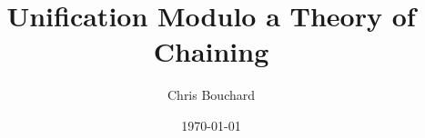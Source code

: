 \documentclass[11pt,titlepage]{book}
\title{Unification Modulo a Theory of Chaining}
\author{Chris Bouchard}
\date{\ddmmmyyyydate\today}
\begin{document}

    \begin{titlepage}
        
    \end{titlepage}

    \cleardoublepage

    \begin{center}
        \begin{minipage}{0.85\linewidth}
            
        \end{minipage}
    \end{center}
    \cleardoublepage

    \tableofcontents
    \cleardoublepage


    
\end{document}
